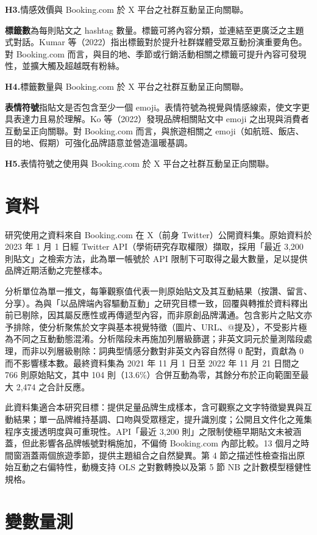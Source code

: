 \documentclass[12pt,a4paper]{ctexart}
\begin{document}
\textbf{H3.}情感效價與 Booking.com 於 X 平台之社群互動呈正向關聯。

\textbf{標籤數}為每則貼文之 hashtag 數量。標籤可將內容分類，並連結至更廣泛之主題式對話。Kumar 等（2022）指出標籤對於提升社群媒體受眾互動扮演重要角色。對 Booking.com 而言，與目的地、季節或行銷活動相關之標籤可提升內容可發現性，並擴大觸及超越既有粉絲。

\textbf{H4.}標籤數量與 Booking.com 於 X 平台之社群互動呈正向關聯。

\textbf{表情符號}指貼文是否包含至少一個 emoji。表情符號為視覺與情感線索，使文字更具表達力且易於理解。Ko 等（2022）發現品牌相關貼文中 emoji 之出現與消費者互動呈正向關聯。對 Booking.com 而言，與旅遊相關之 emoji（如航班、飯店、目的地、假期）可強化品牌語意並營造溫暖基調。

\textbf{H5.}表情符號之使用與 Booking.com 於 X 平台之社群互動呈正向關聯。

\section{資料}

研究使用之資料來自 Booking.com 在 X（前身 Twitter）公開資料集。原始資料於 2023 年 1 月 1 日經 Twitter API（學術研究存取權限）擷取，採用「最近 3{,}200 則貼文」之檢索方法，此為單一帳號於 API 限制下可取得之最大數量，足以提供品牌近期活動之完整樣本。

分析單位為單一推文，每筆觀察值代表一則原始貼文及其互動結果（按讚、留言、分享）。為與「以品牌端內容驅動互動」之研究目標一致，回覆與轉推於資料釋出前已剔除，因其屬反應性或再傳遞型內容，而非原創品牌溝通。包含影片之貼文亦予排除，使分析聚焦於文字與基本視覺特徵（圖片、URL、@提及），不受影片極為不同之互動動態混淆。分析階段未再施加列層級篩選；非英文詞元於量測階段處理，而非以列層級剔除：詞典型情感分數對非英文內容自然得 0 配對，貢獻為 0 而不影響樣本數。最終資料集為 2021 年 11 月 1 日至 2022 年 11 月 21 日間之 766 則原始貼文，其中 104 則（13.6\%）合併互動為零，其餘分布於正向範圍至最大 2{,}474 之合計反應。

此資料集適合本研究目標：提供足量品牌生成樣本，含可觀察之文字特徵變異與互動結果；單一品牌維持基調、口吻與受眾穩定，提升識別度；公開且文件化之蒐集程序支援透明度與可重現性。API「最近 3{,}200 則」之限制使極早期貼文未被涵蓋，但此影響各品牌帳號對稱施加，不偏倚 Booking.com 內部比較。13 個月之時間窗涵蓋兩個旅遊季節，提供主題組合之自然變異。第 4 節之描述性檢查指出原始互動之右偏特性，動機支持 OLS 之對數轉換以及第 5 節 NB 之計數模型穩健性規格。

\section{變數量測}
\end{document}
